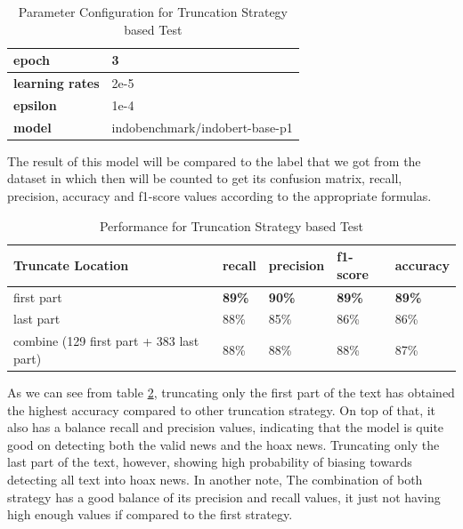 \begin{table}[h]
  \caption{Parameter Configuration for Truncation Strategy based Test}
  \label{tab: truncate_param}
  \centering
  \begin{tabular}{|l|l|}
    \hline
    \textbf{epoch}          & 3                              \\ \hline
    \textbf{learning rates} & 2e-5                           \\ \hline
    \textbf{epsilon}        & 1e-4                           \\ \hline
    \textbf{model}          & indobenchmark/indobert-base-p1 \\ \hline
  \end{tabular}
\end{table}

The result of this model will be compared to the label that we got from the dataset in which then will be counted to get its confusion matrix, recall, precision, accuracy and f1-score values according to the appropriate formulas.

\begin{table}[h]
  \centering
  \caption{Performance for Truncation Strategy based Test}
  \label{tab: truncate_result}
  \begin{tabular}{|p{}|l|l|l|l|}
    \hline
    \textbf{Truncate Location}               & \textbf{recall} & \textbf{precision} & \textbf{f1-score} & \textbf{accuracy} \\ \hline
    first part                               & \textbf{89\%}   & \textbf{90\%}      & \textbf{89\%}     & \textbf{89\%}     \\ \hline
    last part                                & 88\%            & 85\%               & 86\%              & 86\%              \\ \hline
    combine (129 first part + 383 last part) & 88\%            & 88\%               & 88\%              & 87\%              \\ \hline
  \end{tabular}
\end{table}

As we can see from table \ref{tab: truncate_result}, truncating only the first part of the text has obtained the highest accuracy compared to other truncation strategy. On top of that, it also has a balance recall and precision values, indicating that the model is quite good on detecting both the valid news and the hoax news. Truncating only the last part of the text, however, showing high probability of biasing towards detecting all text into hoax news. In another note, The combination of both strategy has a good balance of its precision and recall values, it just not having high enough values if compared to the first strategy.


